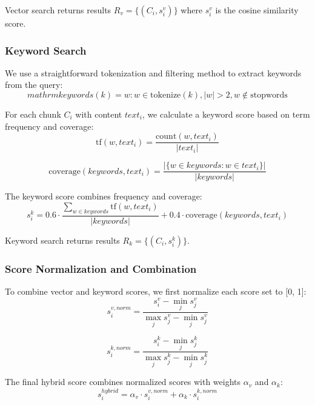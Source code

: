 \documentclass[runningheads]{llncs}
\begin{document}
Vector search returns results $R_v = \{(C_i, s_i^v)\}$ where $s_i^v$ is the cosine similarity score.

\subsubsection{Keyword Search}

We use a straightforward tokenization and filtering method to extract keywords from the query:
\begin{equation}mathrm{keywords}(k) = w: w \in \mathrm{tokenize}(k), |w| > 2, w \notin \mathrm{stopwords} \end{equation}

For each chunk $C_i$ with content $text_i$, we calculate a keyword score based on term frequency and coverage:
\begin{equation}
\mathrm{tf}(w, text_i) = \frac{\mathrm{count}(w, text_i)}{|text_i|}
\end{equation}

\begin{equation}
\mathrm{coverage}(keywords, text_i) = \frac{|\{w \in keywords : w \in text_i\}|}{|keywords|}
\end{equation}

The keyword score combines frequency and coverage:
\begin{equation}
s_i^k = 0.6 \cdot \frac{\sum_{w \in keywords} \mathrm{tf}(w, text_i)}{|keywords|} + 0.4 \cdot \mathrm{coverage}(keywords, text_i)
\end{equation}

Keyword search returns results $R_k = \{(C_i, s_i^k)\}$.

\subsubsection{Score Normalization and Combination}

To combine vector and keyword scores, we first normalize each score set to [0, 1]:
\begin{equation}
s_i^{v,norm} = \frac{s_i^v - \min_{j} s_j^v}{\max_{j} s_j^v - \min_{j} s_j^v}
\end{equation}

\begin{equation}
s_i^{k,norm} = \frac{s_i^k - \min_{j} s_j^k}{\max_{j} s_j^k - \min_{j} s_j^k}
\end{equation}

The final hybrid score combines normalized scores with weights $\alpha_v$ and $\alpha_k$:
\begin{equation}
s_i^{hybrid} = \alpha_v \cdot s_i^{v,norm} + \alpha_k \cdot s_i^{k,norm}
\end{equation}
\end{document}
